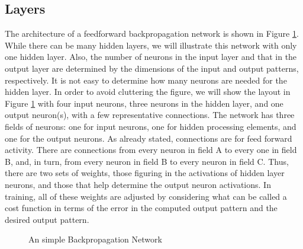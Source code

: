 \subsection{Layers}

The architecture of a feedforward backpropagation network is shown in Figure \ref{fig:simple_backpropagation}. While there can be many hidden layers, we will illustrate this network with only one hidden layer. Also, the number of neurons in the input layer and
that in the output layer are determined by the dimensions of the input and
output patterns, respectively. It is not easy to determine how many neurons are
needed for the hidden layer. In order to avoid cluttering the figure, we will
show the layout in Figure \ref{fig:simple_backpropagation} with four input neurons, three neurons in the
hidden layer, and one output neuron(s), with a few representative connections.
The network has three fields of neurons: one for input neurons, one for hidden
processing elements, and one for the output neurons. As already stated,
connections are for feed forward activity. There are connections from every
neuron in field A to every one in field B, and, in turn, from every neuron in
field B to every neuron in field C. Thus, there are two sets of weights, those
figuring in the activations of hidden layer neurons, and those that help
determine the output neuron activations. In training, all of these weights are
adjusted by considering what can be called a cost function in terms of the error
in the computed output pattern and the desired output pattern. \\
\def\layersep{2.5cm}
\begin{figure}[ht!]
\caption{An simple Backpropagation Network} 
\label{fig:simple_backpropagation}
\centering
{}
\end{figure}

